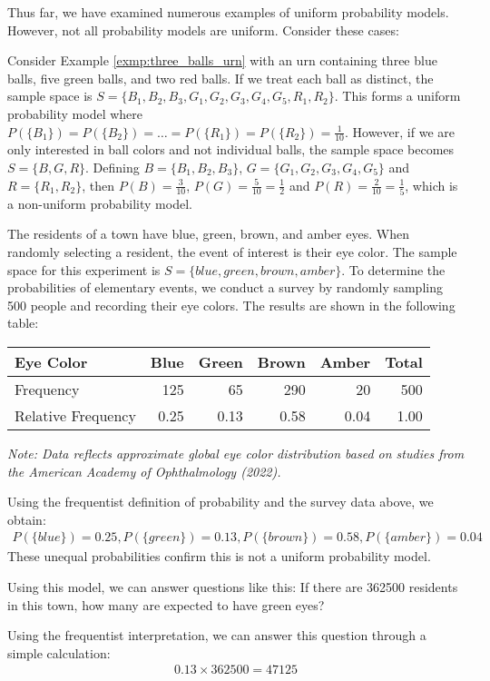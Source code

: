 Thus far, we have examined numerous examples of uniform probability models.
However, not all probability models are uniform.
Consider these cases:

\begin{exmp}
	Consider Example \autoref{exmp:three_balls_urn} with an urn containing three blue balls, five green balls, and two red balls.
	If we treat each ball as distinct, the sample space is \( S = \{ B_1, B_2, B_3, G_1, G_2, G_3, G_4, G_5, R_1, R_2 \} \).
	This forms a uniform probability model where \( P(\{B_1\}) = P(\{B_2\}) = \ldots = P(\{R_1\}) = P(\{R_2\}) = \frac{1}{10} \).
	However, if we are only interested in ball colors and not individual balls,
	the sample space becomes \( S = \{ B, G, R \} \).
	Defining \( B = \{ B_1, B_2, B_3 \} \), \( G = \{ G_1, G_2, G_3, G_4, G_5 \} \) and \( R = \{ R_1, R_2 \} \),
	then \( P(B) = \frac{3}{10} \), \( P(G) = \frac{5}{10} = \frac{1}{2} \) and \( P(R) = \frac{2}{10} = \frac{1}{5} \),
	which is a non-uniform probability model.
\end{exmp}

\begin{exmp}\label{exmp:eye_color}
	The residents of a town have blue, green, brown, and amber eyes.
	When randomly selecting a resident, the event of interest is their eye color.
	The sample space for this experiment is \( S = \{ blue, green, brown, amber \} \).
	To determine the probabilities of elementary events, we conduct a survey by randomly sampling 500 people and recording their eye colors.
	The results are shown in the following table:
	\begin{center}
	\begin{tabular}{|l|r|r|r|r|r|}
	\hline
	\textbf{Eye Color} & \textbf{Blue} & \textbf{Green} & \textbf{Brown} & \textbf{Amber} & \textbf{Total} \\ 
	\hline
	Frequency & 125 & 65 & 290 & 20 & 500 \\
	Relative Frequency & 0.25 & 0.13 & 0.58 & 0.04 & 1.00 \\
	\hline
	\end{tabular}
	\end{center}
	{\footnotesize\textit{Note: Data reflects approximate global eye color distribution based on studies from the American Academy of Ophthalmology (2022).}}
	
	Using the frequentist definition of probability and the survey data above, we obtain:
	\begin{align*}
		P(\{blue\}) = 0.25, P(\{green\}) = 0.13, P(\{brown\}) = 0.58, P(\{amber\}) = 0.04
	\end{align*}
	These unequal probabilities confirm this is not a uniform probability model.

	Using this model, we can answer questions like this:
	If there are 362500 residents in this town, how many are expected to have green eyes?
	
	Using the frequentist interpretation, we can answer this question through a simple calculation:
	\begin{align*}
		0.13 \times 362500 = 47125
	\end{align*}
\end{exmp}

